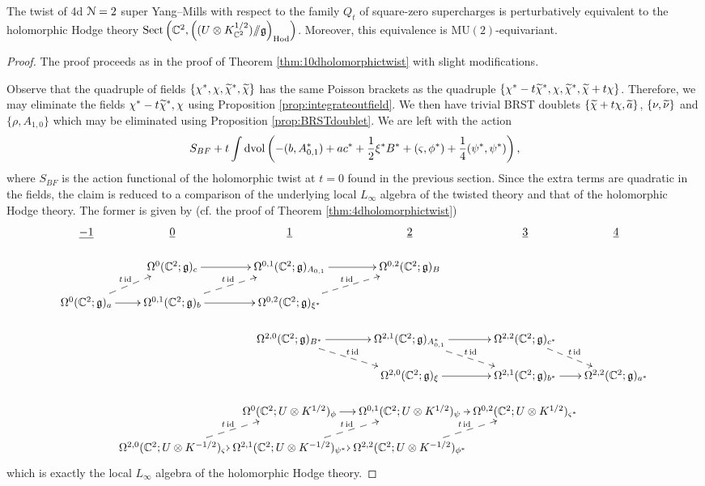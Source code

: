 \documentclass[10pt, oneside]{article}
\newcommand{\Hod}{\mathrm{Hod}}
\newcommand{\MU}{\mathrm{MU}}
\newcommand{\Sect}{\mathrm{Sect}}
\newcommand{\ham}{/\!\!/}
\begin{document}
\begin{theorem}
The twist of 4d $\mathcal N=2$ super Yang--Mills with respect to the family $Q_t$ of square-zero supercharges is perturbatively equivalent to the holomorphic Hodge theory $\Sect\left(\CC^2, \left((U\otimes K_{\CC^2}^{1/2})\ham \fg\right)_{\Hod}\right)$. Moreover, this equivalence is $\MU(2)$-equivariant.
\label{thm:4dDonaldsontwist}
\end{theorem}
\begin{proof}
The proof proceeds as in the proof of Theorem \ref{thm:10dholomorphictwist} with slight modifications.

Observe that the quadruple of fields $\{\chi^*, \chi, \widetilde{\chi}^*, \widetilde{\chi}\}$ has the same Poisson brackets as the quadruple $\{\chi^*-t\widetilde{\chi}^*, \chi, \widetilde{\chi}^*, \widetilde{\chi} + t\chi\}$. Therefore, we may eliminate the fields $\chi^*-t\widetilde{\chi}^*, \chi$ using Proposition \ref{prop:integrateoutfield}. We then have trivial BRST doublets $\{\widetilde{\chi} + t\chi, \widetilde{a}\}$, $\{\nu, \widetilde{\nu}\}$ and $\{\rho, A_{1, 0}\}$ which may be eliminated using Proposition \ref{prop:BRSTdoublet}. We are left with the action
\[S_{BF} + t \int\operatorname{dvol}\left(-(b, A_{0, 1}^*) + a c^* + \frac{1}{2} \xi^* B^* + (\varsigma, \phi^*) + \frac 14 (\psi^*, \psi^*) \right),\]
where $S_{BF}$ is the action functional of the holomorphic twist at $t=0$ found in the previous section. 
Since the extra terms are quadratic in the fields, the claim is reduced to a comparison of the underlying local $L_\infty$ algebra of the twisted theory and that of the holomorphic Hodge theory. The former is given by (cf. the proof of Theorem \ref{thm:4dholomorphictwist})
\[
\xymatrix@R=0.5cm@C=0cm{
\ul{-1} & \ul{0} & \ul{1} & \ul{2} & \ul{3} & \ul{4} \\ 
& \Omega^0(\CC^2; \gg)_c \ar[r] &\Omega^{0,1}(\CC^2; \gg)_{A_{0,1}} \ar[r] &\Omega^{0,2}(\CC^2; \gg)_{B} \\
\Omega^0(\CC^2; \gg)_a  \ar@{-->}^{t\id}[ur] \ar[r] &\Omega^{0,1}(\CC^2; \gg)_{b}  \ar@{-->}^{t\id}[ur] \ar[r] &\Omega^{0,2}(\CC^2; \gg)_{\xi^*}  \ar@{-->}^{t\id}[ur] \\
& &  \Omega^{2,0}(\CC^2 ; \gg)_{B^*}  \ar@{-->}^{t\id}[dr] \ar[r] & \Omega^{2,1}(\CC^2 ; \gg)_{A_{0,1}^*} \ar[r]  \ar@{-->}^{t\id}[dr] & \Omega^{2,2}(\CC^2 ; \gg)_{c^*}  \ar@{-->}^{t\id}[dr] \\
& & & \Omega^{2,0}(\CC^2; \gg)_\xi \ar[r] &\Omega^{2,1}(\CC^2; \gg)_{b^*} \ar[r] &\Omega^{2,2}(\CC^2; \gg)_{a^*}  \\
& & \Omega^0(\CC^2 ; U\otimes K^{1/2})_\phi \ar[r] & \Omega^{0,1}(\CC^2 ; U\otimes K^{1/2})_\psi \ar[r] & \Omega^{0,2}(\CC^2 ; U\otimes K^{1/2})_{\varsigma^*} \\
& \Omega^{2,0}(\CC^2 ; U\otimes K^{-1/2})_{\varsigma} \ar[r]  \ar@{-->}^{t\id}[ur] & \Omega^{2,1}(\CC^2 ; U\otimes K^{-1/2})_{\psi^*} \ar[r]  \ar@{-->}^{t\id}[ur]  & \Omega^{2,2}(\CC^2 ; U\otimes K^{-1/2})_{\phi^*}  \ar@{-->}^{t\id}[ur]
}
\]
which is exactly the local $L_\infty$ algebra of the holomorphic Hodge theory.
\end{proof}
\end{document}
